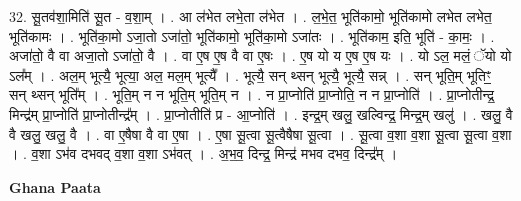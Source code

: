 \documentclass[17pt]{extarticle}
\begin{document}
32. सू॒तव॑शा॒मिति॑ सू॒त - व॒शा॒म् । . आ ल॑भेत लभे॒ता ल॑भेत । . ल॒भे॒त॒ भूति॑कामो॒ भूति॑कामो लभेत लभेत॒ भूति॑कामः । . भूति॑का॒मो ऽजा॒तो ऽजा॑तो॒ भूति॑कामो॒ भूति॑का॒मो ऽजा॑तः । . भूति॑काम॒ इति॒ भूति॑ - का॒मः॒ । . अजा॑तो॒ वै वा अजा॒तो ऽजा॑तो॒ वै । . वा ए॒ष ए॒ष वै वा ए॒षः । . ए॒ष यो य ए॒ष ए॒ष यः । . यो ऽल॒ मलं॒ ॅयो यो ऽल᳚म् । . अल॒म् भूत्यै॒ भूत्या॒ अल॒ मल॒म् भूत्यै᳚ । . भूत्यै॒ सन् थ्सन् भूत्यै॒ भूत्यै॒ सन्न् । . सन् भूति॒म् भूतिꣳ॒॒ सन् थ्सन् भूति᳚म् । . भूति॒म् न न भूति॒म् भूति॒म् न । . न प्रा॒प्नोति॑ प्रा॒प्नोति॒ न न प्रा॒प्नोति॑ । . प्रा॒प्नोतीन्द्र॒ मिन्द्र॑म् प्रा॒प्नोति॑ प्रा॒प्नोतीन्द्र᳚म् । . प्रा॒प्नोतीति॑ प्र - आ॒प्नोति॑ । . इन्द्र॒म् खलु॒ खल्विन्द्र॒ मिन्द्र॒म् खलु॑ । . खलु॒ वै वै खलु॒ खलु॒ वै । . वा ए॒षैषा वै वा ए॒षा । . ए॒षा सू॒त्वा सू॒त्वैषैषा सू॒त्वा । . सू॒त्वा व॒शा व॒शा सू॒त्वा सू॒त्वा व॒शा । . व॒शा ऽभ॑व दभवद् व॒शा व॒शा ऽभ॑वत् । . अ॒भ॒व॒ दिन्द्र॒ मिन्द्र॑ मभव दभव॒ दिन्द्र᳚म् । \newline

\textbf{Ghana Paata } \newline
\end{document}
